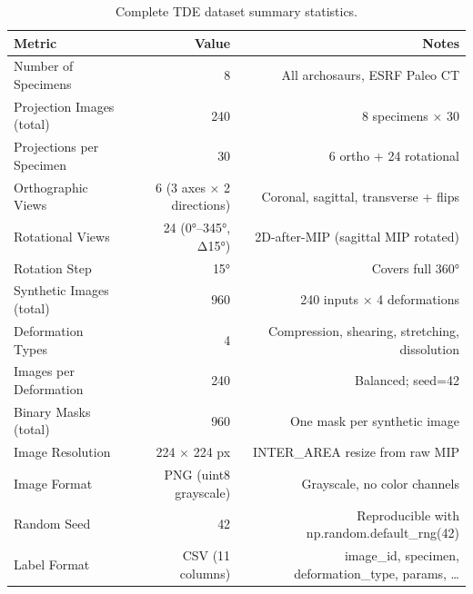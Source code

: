 \begin{table}[htbp]
\caption{Complete TDE dataset summary statistics.}
\label{tab:dataset_summary}
\begin{tabular}{lrr}
\toprule
Metric & Value & Notes \\
\midrule
Number of Specimens & 8 & All archosaurs, ESRF Paleo CT \\
Projection Images (total) & 240 & 8 specimens × 30 \\
Projections per Specimen & 30 & 6 ortho + 24 rotational \\
Orthographic Views & 6 (3 axes × 2 directions) & Coronal, sagittal, transverse + flips \\
Rotational Views & 24 (0°–345°, Δ15°) & 2D-after-MIP (sagittal MIP rotated) \\
Rotation Step & 15° & Covers full 360° \\
Synthetic Images (total) & 960 & 240 inputs × 4 deformations \\
Deformation Types & 4 & Compression, shearing, stretching, dissolution \\
Images per Deformation & 240 & Balanced; seed=42 \\
Binary Masks (total) & 960 & One mask per synthetic image \\
Image Resolution & 224 × 224 px & INTER\_AREA resize from raw MIP \\
Image Format & PNG (uint8 grayscale) & Grayscale, no color channels \\
Random Seed & 42 & Reproducible with np.random.default\_rng(42) \\
Label Format & CSV (11 columns) & image\_id, specimen, deformation\_type, params, … \\
\bottomrule
\end{tabular}
\end{table}
